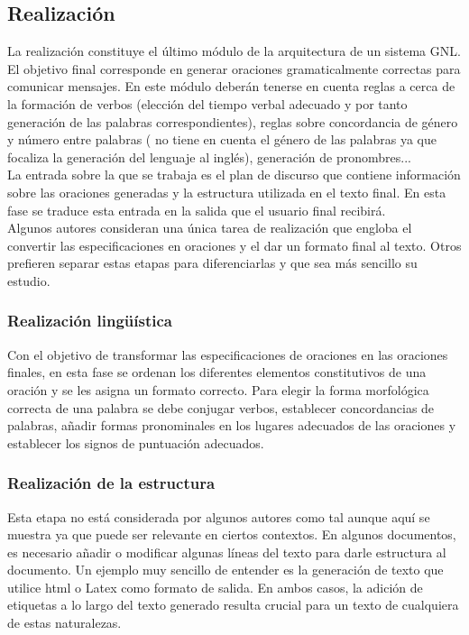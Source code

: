 \subsection{Realización}
La realización constituye el último módulo de la arquitectura de un sistema GNL. El objetivo final corresponde en generar oraciones gramaticalmente correctas para comunicar mensajes. En este módulo deberán tenerse en cuenta reglas a cerca de la formación de verbos (elección del tiempo verbal adecuado y por tanto generación de las palabras correspondientes), reglas sobre concordancia de género y número entre palabras (\cite{reiter1997building} no tiene en cuenta el género de las palabras ya que focaliza la generación del lenguaje al inglés), generación de pronombres...\\
 
La entrada sobre la que se trabaja es el plan de discurso que contiene información sobre las oraciones generadas y la estructura utilizada en el texto final. En esta fase se traduce esta entrada en la salida que el usuario final recibirá.\\

Algunos autores consideran una única tarea de realización que engloba el convertir las especificaciones en oraciones y el dar un formato final al texto. Otros prefieren separar estas etapas para diferenciarlas y que sea más sencillo su estudio.\\

\subsubsection{Realización lingüística}
Con el objetivo de transformar las especificaciones de oraciones en las oraciones finales, en esta fase se ordenan los diferentes elementos constitutivos de una oración y se les asigna un formato correcto. Para elegir la forma morfológica correcta de una palabra se debe conjugar verbos, establecer concordancias de palabras, añadir formas pronominales en los lugares adecuados de las oraciones y establecer los signos de puntuación adecuados. \\

\subsubsection{Realización de la estructura}
Esta etapa no está considerada por algunos autores como tal aunque aquí se muestra ya que puede ser relevante en ciertos contextos. 
En algunos documentos, es necesario añadir o modificar algunas líneas del texto para darle estructura al documento. Un ejemplo muy sencillo de entender es la generación de texto que utilice html o Latex como formato de salida. En ambos casos, la adición de etiquetas a lo largo del texto generado resulta crucial para un texto de cualquiera de estas naturalezas.\\


